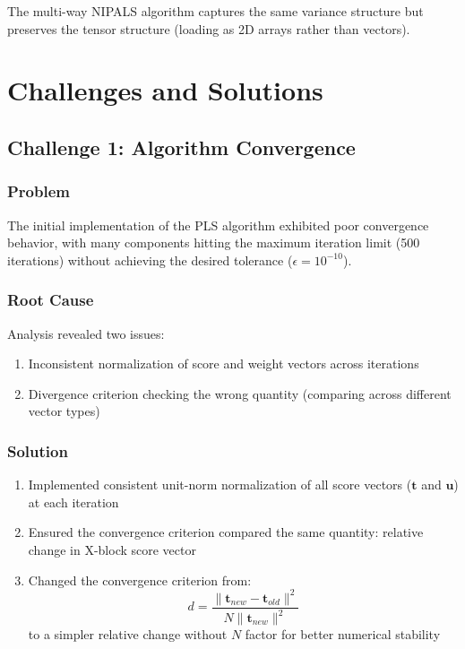 \documentclass[12pt,a4paper]{article}
\begin{document}
The multi-way NIPALS algorithm captures the same variance structure but preserves the tensor structure (loading as 2D arrays rather than vectors).

\newpage

\section{Challenges and Solutions}

\subsection{Challenge 1: Algorithm Convergence}

\subsubsection{Problem}
The initial implementation of the PLS algorithm exhibited poor convergence behavior, with many components hitting the maximum iteration limit (500 iterations) without achieving the desired tolerance ($\epsilon = 10^{-10}$).

\subsubsection{Root Cause}
Analysis revealed two issues:
\begin{enumerate}
    \item Inconsistent normalization of score and weight vectors across iterations
    \item Divergence criterion checking the wrong quantity (comparing across different vector types)
\end{enumerate}

\subsubsection{Solution}
\begin{enumerate}
    \item Implemented consistent unit-norm normalization of all score vectors ($\mathbf{t}$ and $\mathbf{u}$) at each iteration
    \item Ensured the convergence criterion compared the same quantity: relative change in X-block score vector
    \item Changed the convergence criterion from:
    $$d = \frac{\|\mathbf{t}_{new} - \mathbf{t}_{old}\|^2}{N \|\mathbf{t}_{new}\|^2}$$
    to a simpler relative change without $N$ factor for better numerical stability
\end{enumerate}
\end{document}
